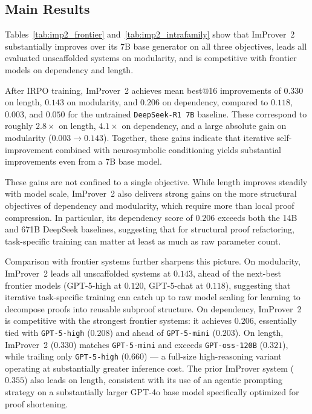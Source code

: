 \subsection{Main Results}
\label{sec:imp2_main_results}

Tables~\ref{tab:imp2_frontier} and~\ref{tab:imp2_intrafamily} show that ImProver~2 substantially improves over its 7B base generator on all three objectives, leads all evaluated unscaffolded systems on modularity, and is competitive with frontier models on dependency and length.

After IRPO training, ImProver~2 achieves mean best@16 improvements of $0.330$ on length, $0.143$ on modularity, and $0.206$ on dependency, compared to $0.118$, $0.003$, and $0.050$ for the untrained \texttt{DeepSeek-R1 7B} baseline. These correspond to roughly $2.8\times$ on length, $4.1\times$ on dependency, and a large absolute gain on modularity ($0.003 \to 0.143$). Together, these gains indicate that iterative self-improvement combined with neurosymbolic conditioning yields substantial improvements even from a 7B base model.

These gains are not confined to a single objective. While length improves steadily with model scale, ImProver~2 also delivers strong gains on the more structural objectives of dependency and modularity, which require more than local proof compression. In particular, its dependency score of $0.206$ exceeds both the 14B and 671B DeepSeek baselines, suggesting that for structural proof refactoring, task-specific training can matter at least as much as raw parameter count.

Comparison with frontier systems further sharpens this picture. On modularity, ImProver~2 leads all unscaffolded systems at $0.143$, ahead of the next-best frontier models (GPT-5-high at $0.120$, GPT-5-chat at $0.118$), suggesting that iterative task-specific training can catch up to raw model scaling for learning to decompose proofs into reusable subproof structure. On dependency, ImProver~2 is competitive with the strongest frontier systems: it achieves $0.206$, essentially tied with \texttt{GPT-5-high} ($0.208$) and ahead of \texttt{GPT-5-mini} ($0.203$). On length, ImProver~2 ($0.330$) matches \texttt{GPT-5-mini} and exceeds \texttt{GPT-oss-120B} ($0.321$), while trailing only \texttt{GPT-5-high} ($0.660$) --- a full-size high-reasoning variant operating at substantially greater inference cost. The prior ImProver system ($0.355$) also leads on length, consistent with its use of an agentic prompting strategy on a substantially larger GPT-4o base model specifically optimized for proof shortening.

